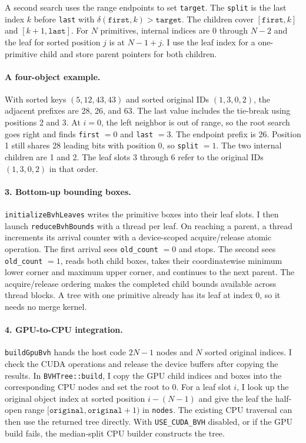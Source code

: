 \documentclass[acmtog]{acmart}
\begin{document}
A second search uses the range endpoints to set \texttt{target}. The \texttt{split} is the last index $k$ before \texttt{last} with $\delta(\texttt{first},k)>\texttt{target}$. The children cover $[\texttt{first},k]$ and $[k+1,\texttt{last}]$. For $N$ primitives, internal indices are $0$ through $N-2$ and the leaf for sorted position $j$ is at $N-1+j$. I use the leaf index for a one-primitive child and store parent pointers for both children.

\paragraph{A four-object example.}
With sorted keys $(5,12,43,43)$ and sorted original IDs $(1,3,0,2)$, the adjacent prefixes are 28, 26, and 63. The last value includes the tie-break using positions 2 and 3. At $i=0$, the left neighbor is out of range, so the root search goes right and finds \texttt{first} $=0$ and \texttt{last} $=3$. The endpoint prefix is 26. Position 1 still shares 28 leading bits with position 0, so \texttt{split} $=1$. The two internal children are 1 and 2. The leaf slots 3 through 6 refer to the original IDs $(1,3,0,2)$ in that order.

\paragraph{3. Bottom-up bounding boxes.}
\texttt{initializeBvhLeaves} writes the primitive boxes into their leaf slots. I then launch \texttt{reduceBvhBounds} with a thread per leaf. On reaching a parent, a thread increments its arrival counter with a device-scoped acquire/release atomic operation. The first arrival sees \texttt{old\_count} $=0$ and stops. The second sees \texttt{old\_count} $=1$, reads both child boxes, takes their coordinatewise minimum lower corner and maximum upper corner, and continues to the next parent. The acquire/release ordering makes the completed child bounds available across thread blocks. A tree with one primitive already has its leaf at index 0, so it needs no merge kernel.

\paragraph{4. GPU-to-CPU integration.}
\texttt{buildGpuBvh} hands the host code $2N-1$ nodes and $N$ sorted original indices. I check the CUDA operations and release the device buffers after copying the results. In \texttt{BVHTree::build}, I copy the GPU child indices and boxes into the corresponding CPU nodes and set the root to 0. For a leaf slot $i$, I look up the original object index at sorted position $i-(N-1)$ and give the leaf the half-open range $[\texttt{original},\texttt{original}+1)$ in \texttt{nodes}. The existing CPU traversal can then use the returned tree directly. With \texttt{USE\_CUDA\_BVH} disabled, or if the GPU build fails, the median-split CPU builder constructs the tree.
\end{document}
